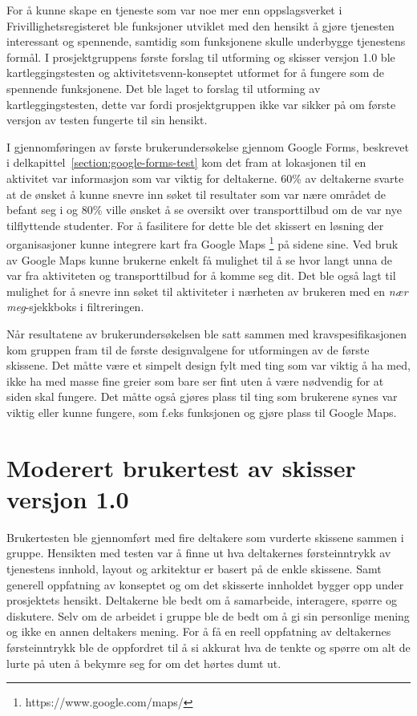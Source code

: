 For å kunne skape en tjeneste som var noe mer enn oppslagsverket i Frivillighetsregisteret ble funksjoner utviklet med den hensikt å gjøre tjenesten interessant og spennende, samtidig som funksjonene skulle underbygge tjenestens formål. I prosjektgruppens første forslag til utforming og skisser versjon 1.0 ble kartleggingstesten og aktivitetsvenn-konseptet utformet for å fungere som de spennende funksjonene. Det ble laget to forslag til utforming av kartleggingstesten, dette var fordi prosjektgruppen ikke var sikker på om første versjon av testen fungerte til sin hensikt.

I gjennomføringen av første brukerundersøkelse gjennom Google Forms, beskrevet i delkapittel~\ref{section:google-forms-test} kom det fram at lokasjonen til en aktivitet var informasjon som var viktig for deltakerne. 60\% av deltakerne svarte at de ønsket å kunne snevre inn søket til resultater som var nære området de befant seg i og 80\% ville ønsket å se oversikt over transporttilbud om de var nye tilflyttende studenter. For å fasilitere for dette ble det skissert en løsning der organisasjoner kunne integrere kart fra Google Maps \footnote{https://www.google.com/maps/} på sidene sine. Ved bruk av Google Maps kunne brukerne enkelt få mulighet til å se hvor langt unna de var fra aktiviteten og transporttilbud for å komme seg dit. Det ble også lagt til mulighet for å snevre inn søket til aktiviteter i nærheten av brukeren med en {\em nær meg}-sjekkboks i filtreringen.

Når resultatene av brukerundersøkelsen ble satt sammen med kravspesifikasjonen kom gruppen fram til de første designvalgene for utformingen av de første skissene.
Det måtte være et simpelt design fylt med ting som var viktig å ha med, ikke ha med masse fine greier som bare ser fint uten å være nødvendig for at siden skal fungere. Det måtte også gjøres plass til ting som brukerene synes var viktig eller kunne fungere, som f.eks  funksjonen og gjøre plass til Google Maps.

\section{Moderert brukertest av skisser versjon 1.0}
\label{section:Moderert brukertest-skisser-1}

Brukertesten ble gjennomført med fire deltakere som vurderte skissene sammen i gruppe. Hensikten med testen var å finne ut hva deltakernes førsteinntrykk av tjenestens innhold, layout og arkitektur er basert på de enkle skissene. Samt generell oppfatning av konseptet og om det skisserte innholdet bygger opp under prosjektets hensikt. Deltakerne ble bedt om å samarbeide, interagere, spørre og diskutere. Selv om de arbeidet i gruppe ble de bedt om å gi sin personlige mening og ikke  en annen deltakers mening. For å få en reell oppfatning av deltakernes førsteinntrykk ble de oppfordret til å si akkurat hva de tenkte og spørre om alt de lurte på uten å bekymre seg for om det hørtes dumt ut.

